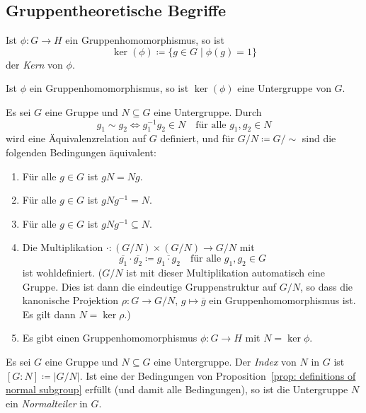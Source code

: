 \subsection{Gruppentheoretische Begriffe}


\begin{definition}
  Ist $\phi \colon G \to H$ ein Gruppenhomomorphismus, so ist
  \[
    \ker(\phi) \coloneqq \{g \in G \mid \phi(g) = 1\}
  \]
  der \emph{Kern} von $\phi$.
\end{definition}


\begin{lemma}
  Ist $\phi$ ein Gruppenhomomorphismus, so ist $\ker(\phi)$ eine Untergruppe von $G$.
\end{lemma}


\begin{proposition}\label{prop: definitions of normal subgroup}
  Es sei $G$ eine Gruppe und $N \subseteq G$ eine Untergruppe.
  Durch
  \[
    g_1 \sim g_2
    \iff
    g_1^{-1} g_2 \in N
    \quad
    \text{für alle $g_1, g_2 \in N$}
  \]
  wird eine Äquivalenzrelation auf $G$ definiert, und für $G/N \coloneqq G/{\sim}$ sind die folgenden Bedingungen äquivalent:
  \begin{enumerate}[leftmargin=*, label=\roman*)]
    \item
      Für alle $g \in G$ ist $g N = N g$.
    \item
      Für alle $g \in G$ ist $g N g^{-1} = N$.
    \item
      Für alle $g \in G$ ist $g N g^{-1} \subseteq N$.
    \item
      Die Multiplikation $\cdot \colon (G/N) \times (G/N) \to G/N$ mit
      \[
        \overline{g_1} \cdot \overline{g_2} \coloneqq \overline{g_1 \cdot g_2}
        \quad
        \text{für alle $g_1, g_2 \in G$}
      \]
      ist wohldefiniert.
      ($G/N$ ist mit dieser Multiplikation automatisch eine Gruppe.
      Dies ist dann die eindeutige Gruppenstruktur auf $G/N$, so dass die kanonische Projektion $\rho \colon G \to G/N$, $g \mapsto \overline{g}$ ein Gruppenhomomorphismus ist.
      Es gilt dann $N = \ker \rho$.)
    \item
      Es gibt einen Gruppenhomomorphismus $\phi \colon G \to H$ mit $N = \ker \phi$.
  \end{enumerate}
\end{proposition}


\begin{definition}
  Es sei $G$ eine Gruppe und $N \subseteq G$ eine Untergruppe.
  Der \emph{Index} von $N$ in $G$ ist $[G : N] \coloneqq |G/N|$.
  Ist eine der Bedingungen von Proposition~\ref{prop: definitions of normal subgroup} erfüllt (und damit alle Bedingungen), so ist die Untergruppe $N$ ein \emph{Normalteiler} in $G$.
\end{definition}


